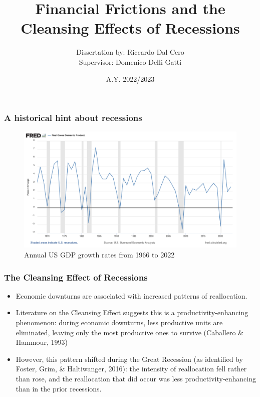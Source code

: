 \documentclass{beamer}
\title[Financial Frictions \& Cleansing Effects]{Financial Frictions and the Cleansing Effects of Recessions}
\author[Riccardo Dal Cero]{Dissertation by: Riccardo Dal Cero \\{\small Supervisor: Domenico Delli Gatti} }
\date[09/04/24]{ A.Y. 2022/2023}
\institute{Università Cattolica del Sacro Cuore \\ Campus of Milan}
\begin{document}
\frame{\titlepage}
\begin{frame}
    \frametitle{A historical hint about recessions}
    \begin{figure}
    \centering
    \includegraphics[scale=0.27]{fredgraph.png}
    \caption{Annual US GDP growth rates from 1966 to 2022}
    \end{figure}
\end{frame}
\begin{frame}
    \frametitle{The Cleansing Effect of Recessions}
    \begin{itemize}
        \item Economic downturns are associated with increased patterns of reallocation.
        \item Literature on the Cleansing Effect suggests this is a productivity-enhancing phenomenon: during economic
        downturns, less productive units are eliminated, leaving only the most productive ones to survive (Caballero \&
        Hammour, 1993)
        \item However, this pattern shifted during the Great Recession (as identified by Foster, Grim, \& Haltiwanger,
        2016): the intensity of reallocation 
        fell rather than rose, and the reallocation that did occur was less productivity-enhancing than in the prior
        recessions.
    \end{itemize}
\end{frame}
\end{document}
